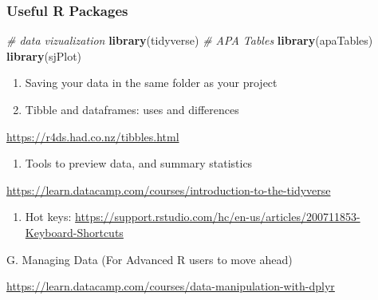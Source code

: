 \documentclass[
]{article}
\newenvironment{Shaded}{\begin{snugshade}}{\end{snugshade}}
\newcommand{\CommentTok}[1]{\textcolor[rgb]{0.56,0.35,0.01}{\textit{#1}}}
\newcommand{\KeywordTok}[1]{\textcolor[rgb]{0.13,0.29,0.53}{\textbf{#1}}}
\newcommand{\NormalTok}[1]{#1}
\providecommand{\tightlist}{%
  \setlength{\itemsep}{0pt}\setlength{\parskip}{0pt}}
\begin{document}
\hypertarget{useful-r-packages}{%
\subsubsection{Useful R Packages}\label{useful-r-packages}}

\begin{Shaded}
\begin{Highlighting}[]
\CommentTok{# data vizualization}
\KeywordTok{library}\NormalTok{(tidyverse)}
\CommentTok{# APA Tables}
\KeywordTok{library}\NormalTok{(apaTables)}
\KeywordTok{library}\NormalTok{(sjPlot)}
\end{Highlighting}
\end{Shaded}

\begin{enumerate}
\def\labelenumi{\alph{enumi}.}
\item
  Saving your data in the same folder as your project
\item
  Tibble and dataframes: uses and differences
\end{enumerate}

\url{https://r4ds.had.co.nz/tibbles.html}

\begin{enumerate}
\def\labelenumi{\alph{enumi}.}
\setcounter{enumi}{2}
\tightlist
\item
  Tools to preview data, and summary statistics
\end{enumerate}

\url{https://learn.datacamp.com/courses/introduction-to-the-tidyverse}

\begin{enumerate}
\def\labelenumi{\alph{enumi}.}
\setcounter{enumi}{3}
\tightlist
\item
  Hot keys:
  \url{https://support.rstudio.com/hc/en-us/articles/200711853-Keyboard-Shortcuts}
\end{enumerate}

G. Managing Data (For Advanced R users to move ahead)

\url{https://learn.datacamp.com/courses/data-manipulation-with-dplyr}
\end{document}
